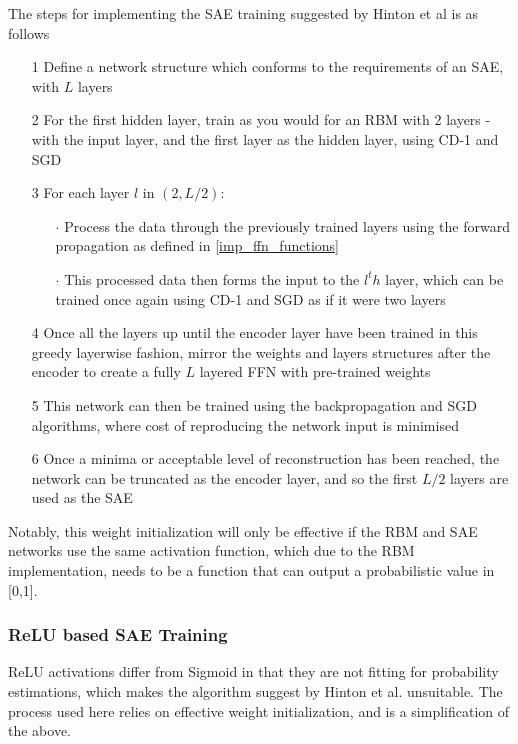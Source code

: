 \documentclass[a4paper,latin]{paper}
\begin{document}
The steps for implementing the SAE training suggested by Hinton et al \cite{Hinton2} is as follows

\begin{itemize}
	\item [1] Define a network structure which conforms to the requirements of an SAE, with $L$ layers
	\item [2] For the first hidden layer, train as you would for an RBM with 2 layers - with the input layer, and the first layer as the hidden layer, using CD-1 and SGD
	\item [3] For each layer $l$ in $(2, L/2)$:
	\begin{itemize}
		\item [$\cdot$] Process the data through the previously trained layers using the forward propagation as defined in \ref{imp_ffn_functions}
		\item [$\cdot$] This processed data then forms the input to the $l^th$ layer, which can be trained once again using CD-1 and SGD as if it were two layers
	\end{itemize}
	\item[4] Once all the layers up until the encoder layer have been trained in this greedy layerwise fashion, mirror the weights and layers structures after the encoder to create a fully $L$ layered FFN with pre-trained weights
	\item [5] This network can then be trained using the backpropagation and SGD algorithms, where cost of reproducing the network input is minimised
	\item [6] Once a minima or acceptable level of reconstruction has been reached, the network can be truncated as the encoder layer, and so the first $L/2$ layers are used as the SAE
\end{itemize}

Notably, this weight initialization will only be effective if the RBM and SAE networks use the same activation function, which due to the RBM implementation, needs to be a function that can output a probabilistic value in [0,1].

\subsubsection{ReLU based SAE Training}\label{imp_relusae}

ReLU activations differ from Sigmoid in that they are not fitting for probability estimations, which makes the algorithm suggest by Hinton et al. unsuitable. The process used here relies on effective weight initialization, and is a simplification of the above.
\end{document}

